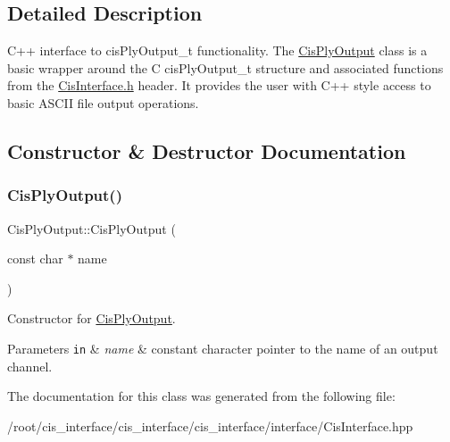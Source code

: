 \subsection{Detailed Description}
C++ interface to cis\+Ply\+Output\+\_\+t functionality. The \mbox{\hyperlink{classCisPlyOutput}{Cis\+Ply\+Output}} class is a basic wrapper around the C cis\+Ply\+Output\+\_\+t structure and associated functions from the \mbox{\hyperlink{CisInterface_8h_source}{Cis\+Interface.\+h}} header. It provides the user with C++ style access to basic A\+S\+C\+II file output operations. 

\subsection{Constructor \& Destructor Documentation}
\mbox{\label{classCisPlyOutput_ae15d8b2786ee6353496795261861e840}} 
\subsubsection{\texorpdfstring{Cis\+Ply\+Output()}{CisPlyOutput()}}
{\footnotesize\ttfamily Cis\+Ply\+Output\+::\+Cis\+Ply\+Output (\begin{DoxyParamCaption}\item[{const char $\ast$}]{name }\end{DoxyParamCaption})\hspace{0.3cm}{\ttfamily [inline]}}



Constructor for \mbox{\hyperlink{classCisPlyOutput}{Cis\+Ply\+Output}}. 


\begin{DoxyParams}[1]{Parameters}
\mbox{\tt in}  & {\em name} & constant character pointer to the name of an output channel. \\
\hline
\end{DoxyParams}


The documentation for this class was generated from the following file\+:\begin{DoxyCompactItemize}
\item 
/root/cis\+\_\+interface/cis\+\_\+interface/cis\+\_\+interface/interface/Cis\+Interface.\+hpp\end{DoxyCompactItemize}
